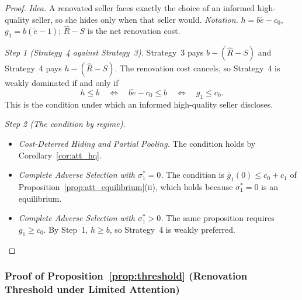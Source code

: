 \begin{proof}\upshape
\emph{Idea.} A renovated seller faces exactly the choice of an informed high-quality seller, so she hides only when that seller would. \emph{Notation.} $h=b\tilde e-c_0$, $g_1=b(\tilde e-1)$; $\hat R-S$ is the net renovation cost.

\emph{Step 1 (Strategy~4 against Strategy~3).} Strategy~3 pays $b-(\hat R-S)$ and Strategy~4 pays $h-(\hat R-S)$. The renovation cost cancels, so Strategy~4 is weakly dominated if and only if
\begin{equation*}
    h\le b\quad\iff\quad b\tilde e-c_0\le b\quad\iff\quad g_1\le c_0.
\end{equation*}
This is the condition under which an informed high-quality seller discloses.

\emph{Step 2 (The condition by regime).}
\begin{itemize}
    \item \emph{Cost-Deterred Hiding and Partial Pooling.} The condition holds by Corollary~\ref{cor:att_hq}.
    \item \emph{Complete Adverse Selection with $\sigma_1^*=0$.} The condition is $\bar g_1(0)\le c_0+c_1$ of Proposition~\ref{prop:att_equilibrium}(ii), which holds because $\sigma_1^*=0$ is an equilibrium.
    \item \emph{Complete Adverse Selection with $\sigma_1^*>0$.} The same proposition requires $g_1\ge c_0$. By Step~1, $h\ge b$, so Strategy~4 is weakly preferred.
\end{itemize}
\end{proof}

\subsubsection*{Proof of Proposition~\ref{prop:threshold} (Renovation Threshold under Limited Attention)}

